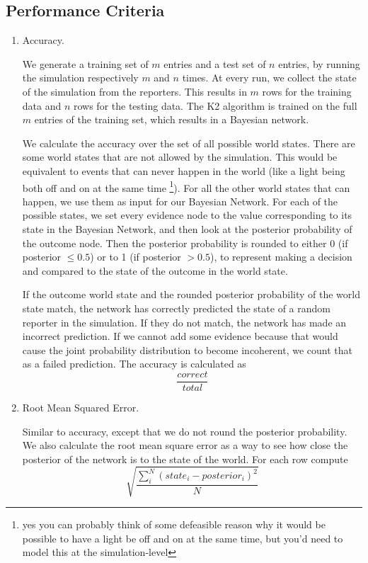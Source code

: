 \subsection{Performance Criteria}
\begin{enumerate}
\item Accuracy.

We generate a training set of $m$ entries and a test set of $n$ entries, by running the simulation respectively $m$ and $n$ times. At every run, we collect the state of the simulation from the reporters. This results in $m$ rows for the training data and $n$ rows for the testing data. The K2 algorithm is trained on the full $m$ entries of the training set, which results in a Bayesian network. 

We calculate the accuracy over the set of all possible world states. There are some world states that are not allowed by the simulation. This would be equivalent to events that can never happen in the world (like a light being both off and on at the same time \footnote{yes you can probably think of some defeasible reason why it would be possible to have a light be off and on at the same time, but you'd need to model this at the simulation-level}). For all the other world states that can happen, we use them as input for our Bayesian Network. For each of the possible states, we set every evidence node to the value corresponding to its state in the Bayesian Network, and then look at the posterior probability of the outcome node. Then the posterior probability is rounded to either 0 (if posterior $\leq 0.5$) or to 1 (if posterior $>0.5$), to represent making a decision and compared to the state of the outcome in the world state. 

If the outcome world state and the rounded posterior probability of the world state match, the network has correctly predicted the state of a random reporter in the simulation. If they do not match, the network has made an incorrect prediction. If we cannot add some evidence because that would cause the joint probability distribution to become incoherent, we count that as a failed prediction. The accuracy is calculated as \[\frac{correct}{total}\]


\item Root Mean Squared Error.

Similar to accuracy, except that we do not round the posterior probability. We also calculate the root mean square error as a way to see how close the posterior of the network is to the state of the world. For each row compute \[\sqrt{\frac{\sum_i^N (state_i - posterior_i)^2}{N}}\] 


\end{enumerate}
